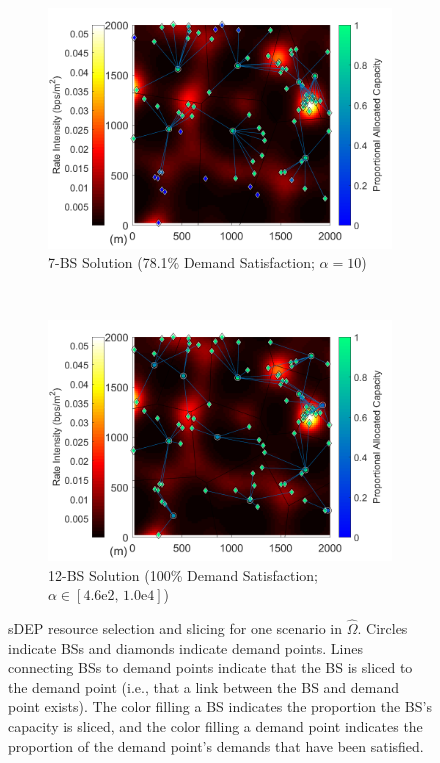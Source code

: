 \documentclass[12pt,dvipsnames]{report}
\newcommand{\expnumber}[2]{{#1}\mathrm{e}{#2}}
\begin{document}
\begin{figure}[p]
	\centering
	\begin{subfigure}{.7\textwidth}
		\centering
		\includegraphics[width=1\linewidth]{Figures/Prelim_VoronoiDemandAllocation_sDEP_7BS}
		\caption{\small 7-BS Solution (78.1\% Demand Satisfaction; $\alpha = 10$)}
		\label{fig:Prelim_VorDemAlloc_sDEP7}
	\end{subfigure} \\
	\begin{subfigure}{.7\textwidth}
		\centering
		\includegraphics[width=1\linewidth]{Figures/Prelim_VoronoiDemandAllocation_sDEP_12BS}
		\caption{\small 12-BS Solution (100\% Demand Satisfaction; $\alpha \in \left[ \expnumber{4.6}{2},\, \expnumber{1.0}{4} \right]$)}
		\label{fig:Prelim_VorDemAlloc_sDEP12}
	\end{subfigure}
	\caption[One sDEP resource selection and slicing solution for the preliminary simulations]{sDEP resource selection and slicing for one scenario in $\hat{\Omega}$.  Circles indicate BSs and diamonds indicate demand points.  Lines connecting BSs to demand points indicate that the BS is sliced to the demand point (i.e., that a link between the BS and demand point exists).  The color filling a BS indicates the proportion the BS's capacity is sliced, and the color filling a demand point indicates the proportion of the demand point's demands that have been satisfied.}
	\label{fig:Prelim_VorDemAlloc_sDEP}
\end{figure}
\end{document}
